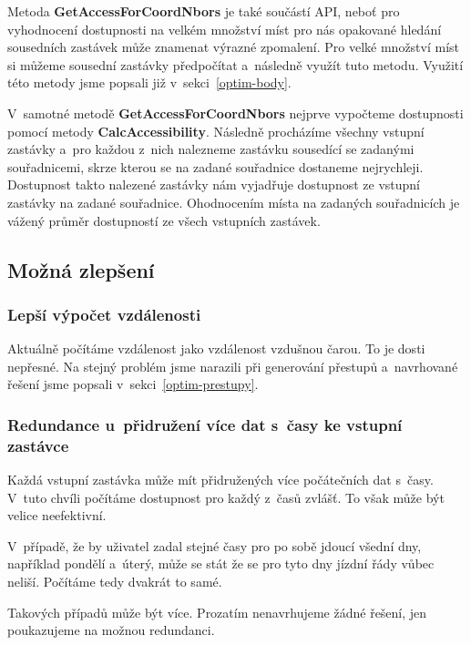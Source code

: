Metoda \textbf{GetAccessForCoordNbors} je také součástí API, neboť pro vyhodnocení dostupnosti na velkém množství míst pro nás opakované hledání sousedních zastávek může znamenat výrazné zpomalení. Pro velké množství míst si můžeme sousední zastávky předpočítat a~následně využít tuto metodu. Využití této metody jsme popsali již v~sekci~\ref{optim-body}.

V~samotné metodě \textbf{GetAccessForCoordNbors} nejprve vypočteme dostupnosti pomocí metody \textbf{CalcAccessibility}. Následně procházíme všechny vstupní zastávky a~pro každou z~nich nalezneme zastávku sousedící se zadanými souřadnicemi, skrze kterou se na zadané souřadnice dostaneme nejrychleji. Dostupnost takto nalezené zastávky nám vyjadřuje dostupnost ze vstupní zastávky na zadané souřadnice. Ohodnocením místa na zadaných souřadnicích je vážený průměr dostupností ze všech vstupních zastávek.

\subsection{Možná zlepšení}

\subsubsection{Lepší výpočet vzdálenosti}

Aktuálně počítáme vzdálenost jako vzdálenost vzdušnou čarou. To je dosti nepřesné. Na stejný problém jsme narazili při generování přestupů a~navrhované řešení jsme popsali v~sekci~\ref{optim-prestupy}.

\subsubsection{Redundance u~přidružení více dat s~časy ke vstupní zastávce}

Každá vstupní zastávka může mít přidružených více počátečních dat s~časy. V~tuto chvíli počítáme dostupnost pro každý z~časů zvlášť. To však může být velice neefektivní.

V~případě, že by uživatel zadal stejné časy pro po sobě jdoucí všední dny, například pondělí a~úterý, může se stát že se pro tyto dny jízdní řády vůbec neliší. Počítáme tedy dvakrát to samé.

Takových případů může být více. Prozatím nenavrhujeme žádné řešení, jen poukazujeme na možnou redundanci.

